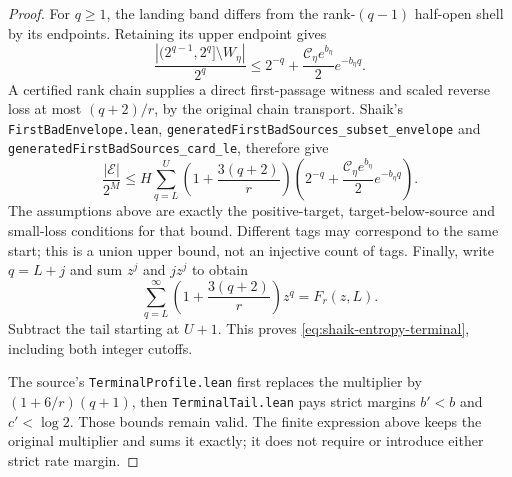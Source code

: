 \documentclass[11pt]{article}
\theoremstyle{remark}\newtheorem{remark}[proposition]{Remark}
\begin{document}
\begin{proof}
For \(q\ge1\), the landing band differs from the rank-\((q-1)\)
half-open shell by its endpoints. Retaining its upper endpoint gives
\[
 \frac{|(2^{q-1},2^q]\setminus W_\eta|}{2^q}
 \le 2^{-q}+\frac{\mathcal C_\eta e^{b_\eta}}2 e^{-b_\eta q}.
\]
A certified rank chain supplies a direct first-passage witness and
scaled reverse loss at most \((q+2)/r\), by the original chain
transport. Shaik's \texttt{FirstBadEnvelope.lean},
\texttt{generatedFirstBadSources\_subset\_envelope} and
\texttt{generatedFirstBadSources\_card\_le}, therefore give
\[
 \frac{|\mathcal E|}{2^M}\le
 H\sum_{q=L}^{U}\left(1+\frac{3(q+2)}r\right)
 \left(2^{-q}+\frac{\mathcal C_\eta e^{b_\eta}}2 e^{-b_\eta q}\right).
\]
The assumptions above are exactly the positive-target,
target-below-source and small-loss conditions for that bound.
Different tags may correspond to the same start; this is a union
upper bound, not an injective count of tags.
Finally, write \(q=L+j\) and sum \(z^j\) and \(jz^j\) to obtain
\[
 \sum_{q=L}^\infty\left(1+\frac{3(q+2)}r\right)z^q=F_r(z,L).
\]
Subtract the tail starting at \(U+1\). This proves
\eqref{eq:shaik-entropy-terminal}, including both integer cutoffs.

The source's \texttt{TerminalProfile.lean} first replaces the multiplier
by \((1+6/r)(q+1)\), then \texttt{TerminalTail.lean} pays strict margins
\(b'<b\) and \(c'<\log2\). Those bounds remain valid.
The finite expression above keeps the original multiplier and sums it
exactly; it does not require or introduce either strict rate margin.
\end{proof}
\end{document}
